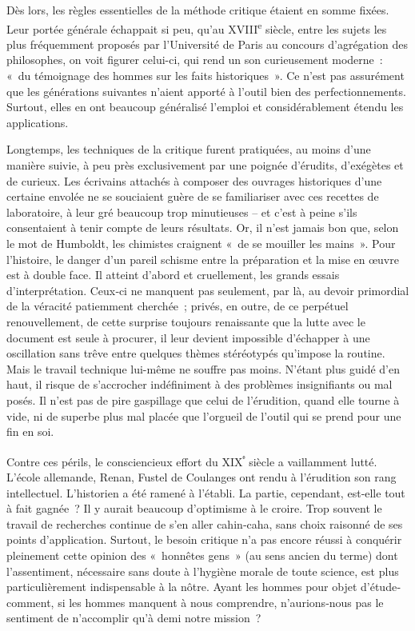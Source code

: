 \documentclass[french,twoside]{book} %
\newcommand{\astermono}{\medskip\centerline{\color{rubric}\large\selectfont{\syms ✻}}\medskip\par}%
\begin{document}
Dès lors, les règles essentielles de la méthode critique étaient en somme fixées. Leur portée générale échappait si peu, qu’au XVIII\textsuperscript{e} siècle, entre les sujets les plus fréquemment proposés par l’Université de Paris au concours d’agrégation des philosophes, on voit figurer celui-ci, qui rend un son curieusement moderne : « du témoignage des hommes sur les faits historiques ». Ce n’est pas assurément que les générations suivantes n’aient apporté à l’outil bien des perfectionnements. Surtout, elles en ont beaucoup généralisé l’emploi et considérablement étendu les appli­cations.\par

\astermono

\noindent Longtemps, les techniques de la critique furent pratiquées, au moins d’une manière suivie, à peu près exclusivement par une poignée d’érudits, d’exégètes et de curieux. Les écrivains attachés à composer des ouvrages historiques d’une certaine envolée ne se souciaient guère de se familiariser avec ces recettes de laboratoire, à leur gré beaucoup trop minutieuses – et c’est à peine s’ils consentaient à tenir compte de leurs résultats. Or, il n’est jamais bon que, selon le mot de Humboldt, les chimistes crai­gnent « de se mouiller les mains ». Pour l’histoire, le danger d’un pareil schisme entre la préparation et la mise en œuvre est à double face. Il  
\label{p39} atteint d’abord et cruellement, les grands essais d’interprétation. Ceux‑ci ne manquent pas seulement, par là, au devoir primordial de la véracité patiemment cherchée ; privés, en outre, de ce perpétuel renouvellement, de cette surprise toujours renaissante que la lutte avec le document est seule à procurer, il leur devient impossible d’échapper à une oscillation sans trêve entre quelques thèmes stéréotypés qu’impose la routine. Mais le travail technique lui-même ne souffre pas moins. N’étant plus guidé d’en haut, il risque de s’accrocher indéfiniment à des problèmes insigni­fiants ou mal posés. Il n’est pas de pire gaspillage que celui de l’érudition, quand elle tourne à vide, ni de superbe plus mal placée que l’orgueil de l’outil qui se prend pour une fin en soi.\par
Contre ces périls, le consciencieux effort du XIX\textsuperscript{ᵉ} siècle a vaillamment lutté. L’école allemande, Renan, Fustel de Coulanges ont rendu à l’éru­dition son rang intellectuel. L’historien a été ramené à l’établi. La partie, cependant, est‑elle tout à fait gagnée ? Il y aurait beaucoup d’optimisme à le croire. Trop souvent le travail de recherches continue de s’en aller cahin‑caha, sans choix raisonné de ses points d’application. Surtout, le besoin critique n’a pas encore réussi à conquérir pleinement cette opinion des « honnêtes gens » (au sens ancien du terme) dont l’assentiment, nécessaire sans doute à l’hygiène morale de toute science, est plus particulièrement indispensable à la nôtre. Ayant les hommes pour objet d’étude­ comment, si les hommes manquent à nous comprendre, n’aurions‑nous pas le sentiment de n’accomplir qu’à demi notre mission ?\par
\end{document}
